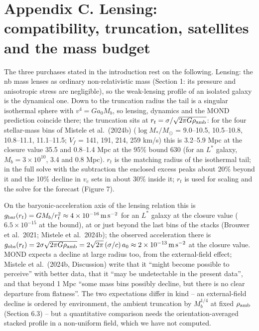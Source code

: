 \documentclass[
  10pt,
]{article}
\begin{document}
\section{Appendix C. Lensing: compatibility, truncation, satellites and the mass budget}\label{appendix-c.-lensing-compatibility-truncation-satellites-and-the-mass-budget}

The three purchases stated in the introduction rest on the following. Lensing: the nb mass lenses as ordinary non-relativistic mass (Section 1: its pressure and anisotropic stress are negligible), so the weak-lensing profile of an isolated galaxy is the dynamical one. Down to the truncation radius the tail is a singular isothermal sphere with $v^4=G a_0 M_b$, so lensing, dynamics and the MOND prediction coincide there; the truncation sits at $r_t=\sigma/\sqrt{2\pi G\rho_{\rm amb}}$: for the four stellar-mass bins of Mistele et al.~(2024b) ($\log M_*/M_\odot$ = 9.0--10.5, 10.5--10.8, 10.8--11.1, 11.1--11.5; $V_f$ = 141, 191, 214, 259 km/s) this is 3.2--5.9 Mpc at the closure value 35.5 and 0.8--1.4 Mpc at the 95\% bound 630 (for an $L^*$ galaxy, $M_b=3\times10^{10}$, 3.4 and 0.8 Mpc). $r_t$ is the matching radius of the isothermal tail; in the full solve with the subtraction the enclosed excess peaks about 20\% beyond it and the 10\% decline in $v_c$ sets in about 30\% inside it; $r_t$ is used for scaling and the solve for the forecast (Figure 7).

On the baryonic-acceleration axis of the lensing relation this is $g_{\rm bar}(r_t)=GM_b/r_t^2\approx 4\times10^{-16}\,{\rm m\,s^{-2}}$ for an $L^*$ galaxy at the closure value ($6.5\times10^{-15}$ at the bound), at or just beyond the last bins of the stacks (Brouwer et al.~2021; Mistele et al.~2024b); the observed acceleration there is $g_{\rm obs}(r_t)=2\sigma\sqrt{2\pi G\rho_{\rm amb}}=2\sqrt{2\pi}\,(\sigma/c)\,a_0\approx 2\times10^{-13}\,{\rm m\,s^{-2}}$ at the closure value. MOND expects a decline at large radius too, from the external-field effect; Mistele et al.~(2024b, Discussion) write that it ``might become possible to perceive'' with better data, that it ``may be undetectable in the present data'', and that beyond 1 Mpc ``some mass bins possibly decline, but there is no clear departure from flatness''. The two expectations differ in kind -- an external-field decline is ordered by environment, the ambient truncation by $M_b^{1/4}$ at fixed $\rho_{\rm amb}$ (Section 6.3) -- but a quantitative comparison needs the orientation-averaged stacked profile in a non-uniform field, which we have not computed.
\end{document}
